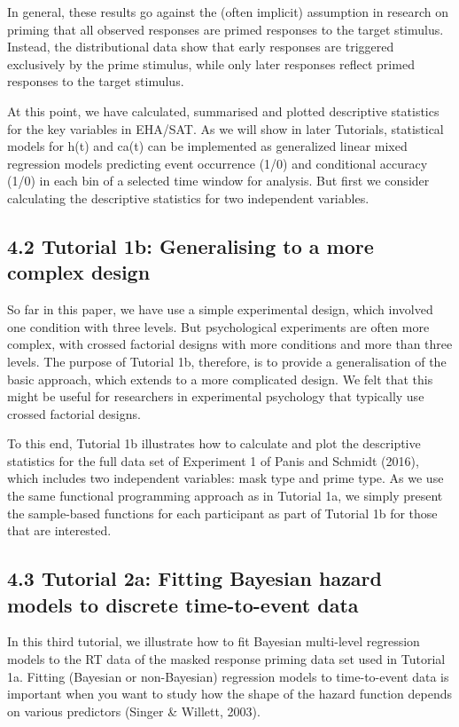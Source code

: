 \documentclass[
  man, donotrepeattitle,floatsintext]{apa6}
\begin{document}
In general, these results go against the (often implicit) assumption in research on priming that all observed responses are primed responses to the target stimulus. Instead, the distributional data show that early responses are triggered exclusively by the prime stimulus, while only later responses reflect primed responses to the target stimulus.

At this point, we have calculated, summarised and plotted descriptive statistics for the key variables in EHA/SAT. As we will show in later Tutorials, statistical models for h(t) and ca(t) can be implemented as generalized linear mixed regression models predicting event occurrence (1/0) and conditional accuracy (1/0) in each bin of a selected time window for analysis. But first we consider calculating the descriptive statistics for two independent variables.

\subsection{4.2 Tutorial 1b: Generalising to a more complex design}\label{tutorial-1b-generalising-to-a-more-complex-design}

So far in this paper, we have use a simple experimental design, which involved one condition with three levels. But psychological experiments are often more complex, with crossed factorial designs with more conditions and more than three levels. The purpose of Tutorial 1b, therefore, is to provide a generalisation of the basic approach, which extends to a more complicated design. We felt that this might be useful for researchers in experimental psychology that typically use crossed factorial designs.

To this end, Tutorial 1b illustrates how to calculate and plot the descriptive statistics for the full data set of Experiment 1 of Panis and Schmidt (2016), which includes two independent variables: mask type and prime type. As we use the same functional programming approach as in Tutorial 1a, we simply present the sample-based functions for each participant as part of Tutorial 1b for those that are interested.

\subsection{4.3 Tutorial 2a: Fitting Bayesian hazard models to discrete time-to-event data}\label{tutorial-2a-fitting-bayesian-hazard-models-to-discrete-time-to-event-data}

In this third tutorial, we illustrate how to fit Bayesian multi-level regression models to the RT data of the masked response priming data set used in Tutorial 1a. Fitting (Bayesian or non-Bayesian) regression models to time-to-event data is important when you want to study how the shape of the hazard function depends on various predictors (Singer \& Willett, 2003).
\end{document}
